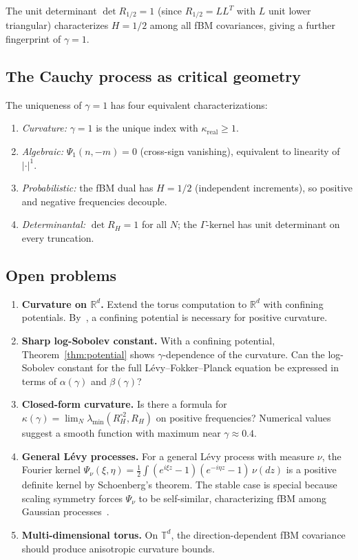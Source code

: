 \documentclass[11pt,a4paper]{article}
\theoremstyle{plain}
\theoremstyle{definition}
\theoremstyle{remark}
\newcommand{\R}{\mathbb{R}}
\newcommand{\T}{\mathbb{T}}
\begin{document}
The unit determinant $\det R_{1/2} = 1$ (since $R_{1/2} = LL^T$
with $L$ unit lower triangular) characterizes $H = 1/2$ among
all fBM covariances, giving a further fingerprint of $\gamma = 1$.


\subsection{The Cauchy process as critical geometry}

The uniqueness of $\gamma = 1$ has four equivalent characterizations:
\begin{enumerate}[label=(\alph*)]
\item \emph{Curvature:} $\gamma = 1$ is the unique index with
  $\kappa_{\mathrm{real}} \geq 1$.
\item \emph{Algebraic:} $\Psi_1(n,-m) = 0$ (cross-sign vanishing),
  equivalent to linearity of $|\cdot|^1$.
\item \emph{Probabilistic:} the fBM dual has $H = 1/2$ (independent
  increments), so positive and negative frequencies decouple.
\item \emph{Determinantal:} $\det R_H = 1$ for all $N$; the
  $\Gamma$-kernel has unit determinant on every truncation.
\end{enumerate}


\subsection{Open problems}

\begin{enumerate}[label=(\roman*)]
\item \textbf{Curvature on $\R^d$.}
  Extend the torus computation to $\R^d$ with confining potentials.
  By~\cite{SpenerWeberZacher2020}, a confining potential is necessary
  for positive curvature.

\item \textbf{Sharp log-Sobolev constant.}
  With a confining potential, Theorem~\ref{thm:potential} shows
  $\gamma$-dependence of the curvature. Can the log-Sobolev constant
  for the full L\'evy--Fokker--Planck equation be expressed in terms of
  $\alpha(\gamma)$ and $\beta(\gamma)$?

\item \textbf{Closed-form curvature.}
  Is there a formula for
  $\kappa(\gamma) = \lim_N \lambda_{\min}(R_H^{\circ 2}, R_H)$
  on positive frequencies? Numerical values suggest a smooth
  function with maximum near $\gamma \approx 0.4$.

\item \textbf{General L\'evy processes.}
  For a general L\'evy process with measure $\nu$, the
  Fourier kernel
  $\Psi_\nu(\xi,\eta) = \frac{1}{2}\int (e^{i\xi z}-1)(e^{-i\eta z}-1)\,
  \nu(dz)$ is a positive definite kernel by Schoenberg's theorem.
  The stable case is special because scaling symmetry forces
  $\Psi_\nu$ to be self-similar, characterizing fBM among Gaussian
  processes~\cite{Mishura2008}.

\item \textbf{Multi-dimensional torus.}
  On $\T^d$, the direction-dependent fBM covariance should produce
  anisotropic curvature bounds.
\end{enumerate}
\end{document}
